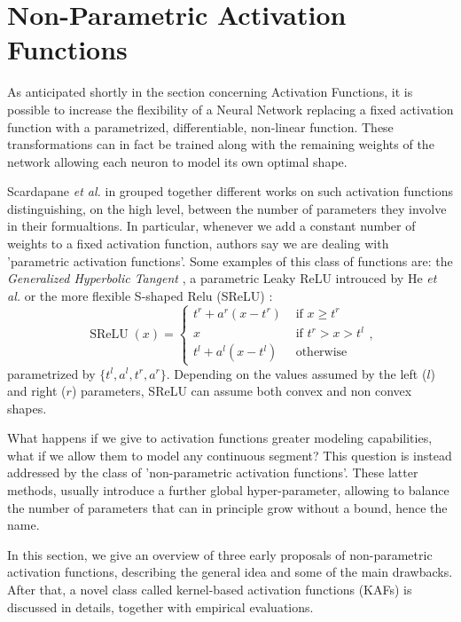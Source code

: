 \documentclass[LaM,binding=0.6cm]{./packages/sapthesis/sapthesis}
\begin{document}
    \chapter{Non-Parametric Activation Functions}
    \label{chap:4}
    As anticipated shortly in the section concerning Activation Functions, it is possible to increase the flexibility of a Neural Network replacing a fixed activation function with a parametrized, differentiable, non-linear function.
    These transformations can in fact be trained along with the remaining weights of the network allowing each neuron to model its own optimal shape.

    Scardapane \textit{et al.} in \cite{kafnets} grouped together different works on such activation functions distinguishing, on the high level, between the number of parameters they involve in their formualtions.
    In particular, whenever we add a constant number of weights to a fixed activation function, authors say we are dealing with 'parametric activation functions'. Some examples of this class of functions are: the \textit{Generalized Hyperbolic Tangent} \cite{hypertanh}
    , a parametric Leaky ReLU introuced by He \textit{et al.} \cite{he2015delving} or the more flexible S-shaped Relu (SReLU) \cite{s-shaped}:
    \begin{equation}
        \label{srelu}
        \operatorname{SReLU}(x)=\left\{\begin{array}{ll}
            t^{r}+a^{r}\left(x-t^{r}\right) & \text { if } x \geq t^{r} \\
            x & \text { if } t^{r}>x>t^{l} \\
            t^{l}+a^{l}\left(x-t^{l}\right) & \text { otherwise }
            \end{array}\right.
            ,
    \end{equation}
    parametrized by $\{t^l,a^l,t^r,a^r\}$. Depending on the values assumed by the left ($l$) and right ($r$) parameters, SReLU can assume both convex and non convex shapes.

    What happens if we give to activation functions greater modeling capabilities, what if we allow them to model any continuous segment? This question is instead addressed by the class of 'non-parametric activation functions'. These latter methods,
    usually introduce a further global hyper-parameter, allowing to balance the number of parameters that can in principle grow without a bound, hence the name.

    In this section, we give an overview of three early proposals of non-parametric activation functions, describing the general idea and some of the main drawbacks. After that, a novel class called kernel-based activation functions
    (KAFs) is discussed in details, together with empirical evaluations.
\end{document}
